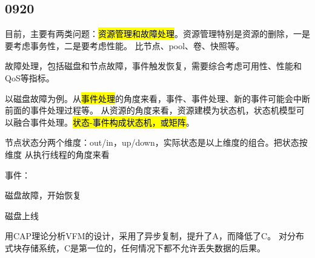 \subsection{0920}

目前，主要有两类问题：\hl{资源管理和故障处理}。资源管理特别是资源的删除，一是要考虑事务性，二是要考虑性能。
比节点、pool、卷、快照等。

故障处理，包括磁盘和节点故障，事件触发恢复，需要综合考虑可用性、性能和QoS等指标。

以磁盘故障为例。从\hl{事件处理}的角度来看，事件、事件处理、新的事件可能会中断前面的事件处理过程等。
从资源的角度来看，资源建模为状态机，状态机模型可以融合事件处理。\hl{状态-事件构成状态机，或矩阵}。

节点状态分两个维度：out/in，up/down，实际状态是以上维度的组合。把状态按维度 
从执行线程的角度来看

事件：
\begin{enumbox}
\item 磁盘故障，开始恢复
\item 磁盘上线
\end{enumbox}

用CAP理论分析VFM的设计，采用了异步复制，提升了A，而降低了C。
对分布式块存储系统，C是第一位的，任何情况下都不允许丢失数据的后果。
